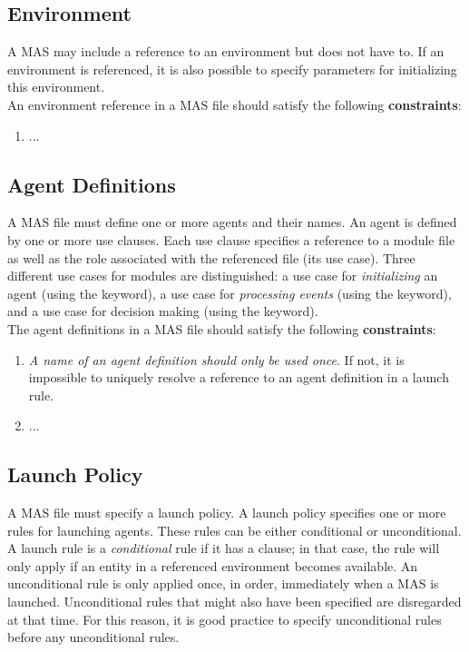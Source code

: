 \documentclass{article}
\begin{document}
%
\subsection{Environment}
%
A MAS may include a reference to an environment but does not have to. If an environment is referenced, it is also possible to specify parameters for initializing this environment.
\\[2ex]
\noindent
An environment reference in a MAS file should satisfy the following \textbf{constraints}:
\begin{enumerate}
\item ...
\end{enumerate}

%
\subsection{Agent Definitions}
%
A MAS file must define one or more agents and their names. An agent is defined by one or more use clauses. Each use clause specifies a reference to a module file as well as the role associated with the referenced file (its use case). Three different use cases for modules are distinguished: a use case for \textit{initializing} an agent (using the \initmod keyword), a use case for \textit{processing events} (using the \eventmod keyword), and a use case for decision making (using the \mainmod keyword).
\\[2ex]
\noindent
The agent definitions in a MAS file should satisfy the following \textbf{constraints}:
\begin{enumerate}
\item \textit{A name of an agent definition should only be used once}. If not, it is impossible to uniquely resolve a reference to an agent definition in a launch rule.
\item ...
\end{enumerate}

%
\subsection{Launch Policy}
%
A MAS file must specify a launch policy. A launch policy specifies one or more rules for launching agents. These rules can be either conditional or unconditional. A launch rule is a \textit{conditional} rule if it has a \when clause; in that case, the rule will only apply if an entity in a referenced environment becomes available. An unconditional rule is only applied once, in order, immediately when a MAS is launched. Unconditional rules that might also have been specified are disregarded at that time. For this reason, it is good practice to specify unconditional rules before any unconditional rules.
\end{document}
